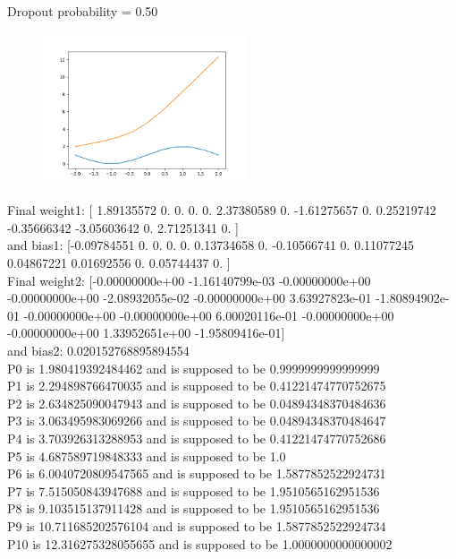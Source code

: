 \documentclass{article}
\begin{document}
Dropout probability = 0.50\\
\begin{figure}[htp]
    \centering
    \includegraphics[width=6cm]{photos/ask7_50.png}
    \label{fig:2}
\end{figure}
Final weight1: [ 1.89135572  0.          0.          0.          0.          2.37380589
  0.         -1.61275657  0.          0.25219742 -0.35666342 -3.05603642
  0.          2.71251341  0.        ] \\and bias1: [-0.09784551  0.          0.          0.          0.          0.13734658
  0.         -0.10566741  0.          0.11077245  0.04867221  0.01692556
  0.          0.05744437  0.        ]\\
Final weight2: [-0.00000000e+00 -1.16140799e-03 -0.00000000e+00 -0.00000000e+00
 -2.08932055e-02 -0.00000000e+00  3.63927823e-01 -1.80894902e-01
 -0.00000000e+00 -0.00000000e+00  6.00020116e-01 -0.00000000e+00
 -0.00000000e+00  1.33952651e+00 -1.95809416e-01]\\ and bias2: 0.020152768895894554\\
P0 is 1.980419392484462 and is supposed to be 0.9999999999999999\\
P1 is 2.294898766470035 and is supposed to be 0.41221474770752675\\
P2 is 2.634825090047943 and is supposed to be 0.04894348370484636\\
P3 is 3.063495983069266 and is supposed to be 0.04894348370484647\\
P4 is 3.703926313288953 and is supposed to be 0.41221474770752686\\
P5 is 4.687589719848333 and is supposed to be 1.0\\
P6 is 6.0040720809547565 and is supposed to be 1.5877852522924731\\
P7 is 7.515050843947688 and is supposed to be 1.9510565162951536\\
P8 is 9.103515137911428 and is supposed to be 1.9510565162951536\\
P9 is 10.711685202576104 and is supposed to be 1.5877852522924734\\
P10 is 12.316275328055655 and is supposed to be 1.0000000000000002\\~\\
\end{document}
